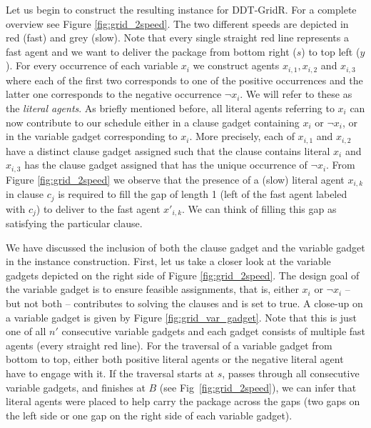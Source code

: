 Let us begin to construct the resulting instance for DDT-GridR. For a complete overview see Figure \ref{fig:grid_2speed}. The two different speeds are depicted in red (fast) and grey (slow). Note that every single straight red line represents a fast agent and we want to deliver the package from bottom right ($s$) to top left ($y$). 
For every occurrence of each variable $x_i$ we construct agents $x_{i,1},x_{i,2}$ and $x_{i,3}$ where each of the first two corresponds to one of the positive occurrences and the latter one corresponds to the negative occurrence $\neg x_i$. We will refer to these as the \textit{literal agents}. 
As briefly mentioned before, all literal agents referring to $x_i$ can now contribute to our schedule either in a clause gadget containing $x_i$ or $\neg x_i$, or in the variable gadget corresponding to $x_i$. More precisely, each of $x_{i,1}$ and $x_{i,2}$ have a distinct clause gadget assigned such that the clause contains literal $x_i$ and $x_{i,3}$ has the clause gadget assigned that has the unique occurrence of $\neg x_i$. From Figure \ref{fig:grid_2speed} we observe that the presence of a (slow) literal agent $x_{i,k}$ in clause $c_j$ is required to fill the gap of length 1 (left of the fast agent labeled with $c_j$) to deliver to the fast agent $x'_{i,k}$. We can think of filling this gap as satisfying the particular clause. 

We have discussed the inclusion of both the clause gadget and the variable gadget in the instance construction. First, let us take a closer look at the variable gadgets depicted on the right side of Figure \ref{fig:grid_2speed}. The design goal of the variable gadget is to ensure feasible assignments, that is, either $x_i$ or $\neg x_i$ – but not both – contributes to solving the clauses and is
set to true. A close-up on a variable gadget is given by Figure \ref{fig:grid_var_gadget}. Note that this is just one of all $n'$ consecutive variable gadgets and each gadget consists of multiple fast agents (every straight red line). For the traversal of a variable gadget from bottom to top, either both positive literal agents or the negative literal agent have to engage with it. If the traversal starts at $s$, passes through all consecutive variable gadgets, and finishes at
$B$ (see Fig~\ref{fig:grid_2speed}), we can infer that literal agents were placed to help carry the package across the gaps (two gaps on the left side or one gap on the right side of each variable gadget). 

